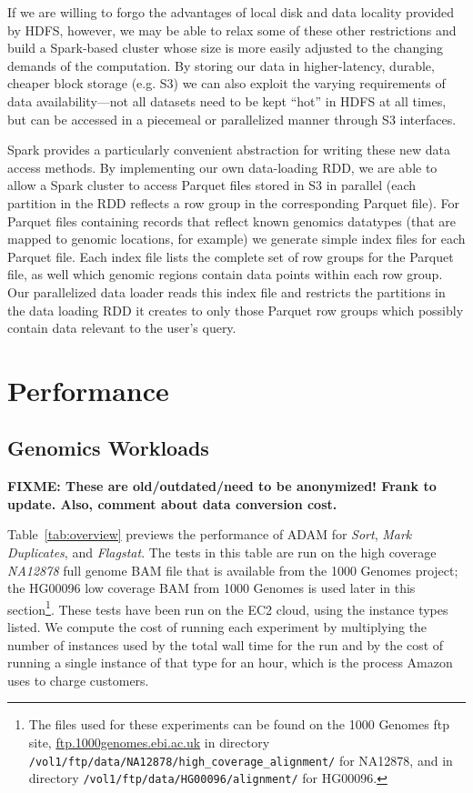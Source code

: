 \documentclass{acm_proc_article-sp}
\begin{document}
If we are willing to forgo the advantages of local disk and data locality provided by HDFS, however, we
may be able to relax some of these other restrictions and build a Spark-based cluster whose size is more
easily adjusted to the changing demands of the computation.  By storing our data in higher-latency,
durable, cheaper block storage (e.g. S3) we can also exploit the varying requirements of data
availability---not all datasets need to be kept ``hot'' in HDFS at all times, but can be accessed in a
piecemeal or parallelized manner through S3 interfaces.

Spark provides a particularly convenient abstraction for writing these new data access methods.  By
implementing our own data-loading RDD, we are able to allow a Spark cluster to access Parquet files
stored in S3 in parallel (each partition in the RDD reflects a row group in the corresponding Parquet file).
For Parquet files containing records that reflect known genomics datatypes (that are mapped to genomic
locations, for example) we generate simple index files for each Parquet file.  Each index file lists the
complete set of row groups for the Parquet file, as well which genomic regions contain data points within
each row group.  Our parallelized data loader reads this index file and restricts the partitions in the data
loading RDD it creates to only those Parquet row groups which possibly contain data relevant to the
user's query.

\section{Performance}
\label{sec:performance}


\subsection{Genomics Workloads}
\label{sec:genomics-performance}

\textbf{FIXME: These are old/outdated/need to be anonymized! Frank to update. Also, comment about data conversion cost.}

Table~\ref{tab:overview} previews the performance of ADAM for \textit{Sort}, \textit{Mark Duplicates},
and \textit{Flagstat}. The tests in this table are run on the high coverage \textit{NA12878} full genome
BAM file that is available from the 1000 Genomes project; the HG00096 low coverage BAM from 1000
Genomes is used later in this section\footnote{The files used for these experiments can be found on the
1000 Genomes ftp site, \url{ftp.1000genomes.ebi.ac.uk} in directory
\texttt{/vol1/ftp/data/NA12878/high\_coverage\_alignment/} for NA12878, and in directory
\texttt{/vol1/ftp/data/HG00096/alignment/} for HG00096.}. These tests have been run on the EC2 cloud,
using the instance types listed. We compute the cost of running each experiment by multiplying the
number of instances used by the total wall time for the run and by the cost of running a single instance
of that type for an hour, which is the process Amazon uses to charge customers.
\end{document}
